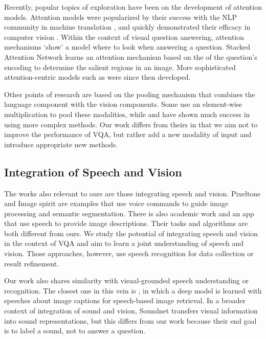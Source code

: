 \documentclass[letterpaper]{article} %
\begin{document}
Recently, popular topics of exploration have been on the development of attention models. Attention models were popularized by their success with the NLP community in machine translation \cite{nmt:joint:align}, and quickly demonstrated their efficacy in computer vision \cite{recurrent:visual:attn}. Within the context of visual question answering, attention mechanisms `show' a model where to look when answering a question. Stacked Attention Network \cite{vqa:stackedattn} learns an attention mechanism based on the of the question's encoding to determine the salient regions in an image. More sophisticated attention-centric models such as \cite{vqa:dualattn,vqa:hieco,vqa:dynamicmemory} were since then developed.

Other points of research are based on the pooling mechanism that combines the language component with the vision components. Some use an element-wise multiplication \cite{vqa:spatial:attn,vqa:stackedattn} to pool these modalities, while \cite{vqa:hieco} and \cite{multimodal:pooling} have shown much success in using more complex methods. Our work differs from theirs in that we aim not to improve the performance of VQA, but rather add a new modality of input and introduce appropriate new methods.


\subsection{Integration of Speech and Vision}
The works also relevant to ours are those integrating speech and vision. Pixeltone \cite{pixel:tone}
and Image spirit \cite{image:spirit} are examples that use voice
commands to guide image processing and semantic segmentation. There is also academic work \cite{speech:anno:img,speech:retri:img} and an app \cite{smile} that use speech to provide image descriptions. Their tasks and algorithms are both different from ours. We study the potential of integrating speech and vision in the context of VQA and aim to learn a joint understanding of speech and vision. Those approaches, however, use speech recognition for data collection or result refinement.

Our work also shares similarity with visual-grounded speech understanding or recognition. The closest one in this vein is \cite{speech:caption}, in which a deep model is learned with speeches about image captions for speech-based image retrieval. In a broader context of integration of sound and vision, Soundnet \cite{soundnet} transfers visual information into sound representations, but this differs from our work because their end goal is to label a sound, not to answer a question.
\end{document}
